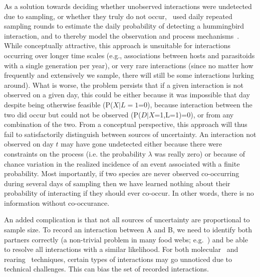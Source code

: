 \documentclass[12pt]{article}
\begin{document}
  As a solution towards deciding whether unobserved interactions were undetected due to sampling, or whether they truly do not occur,~\citet{Weinstein2017} used daily repeated sampling rounds to estimate the daily probability of detecting a hummingbird interaction, and to thereby model the observation and process mechanisms~\citep{Weinstein2017}. While conceptually attractive, this approach is unsuitable for interactions occurring over longer time scales (e.g., associations between hosts and parasitoids with a single generation per year), or very rare interactions (since no matter how frequently and extensively we sample, there will still be some interactions lurking around). What is worse, the problem persists that if a given interaction is not observed on a given day, this could be either because it was impossible that day despite being otherwise feasible (P($X|L=1$=0), because interaction between the two did occur but could not be observed (P($D|X$=1,L=1)=0), or from any combination of the two. From a conceptual perspective, this approach will thus fail to satisfactorily distinguish between sources of uncertainty. An interaction not observed on day $t$ may have gone undetected either because there were constraints on the process (i.e. the probability $\lambda$ was really zero) or because of chance variation in the realized incidence of an event associated with a finite probability. Most importantly, if two species are never observed co-occurring during several days of sampling then we have learned nothing about their probability of interacting if they should ever co-occur. In other words, there is no information without co-occurance.


  An added complication is that not all sources of uncertainty are proportional to sample size. To record an interaction between A and B, we need to identify both partners correctly (a non-trivial problem in many food webs; e.g.~\citet{Kaartinen2011,Roslin2016}) and be able to resolve all interactions with a similar likelihood. For both molecular~\citep{} and rearing~\citep{} techniques, certain types of interactions may go unnoticed due to technical challenges. This can bias the set of recorded interactions.
\end{document}

